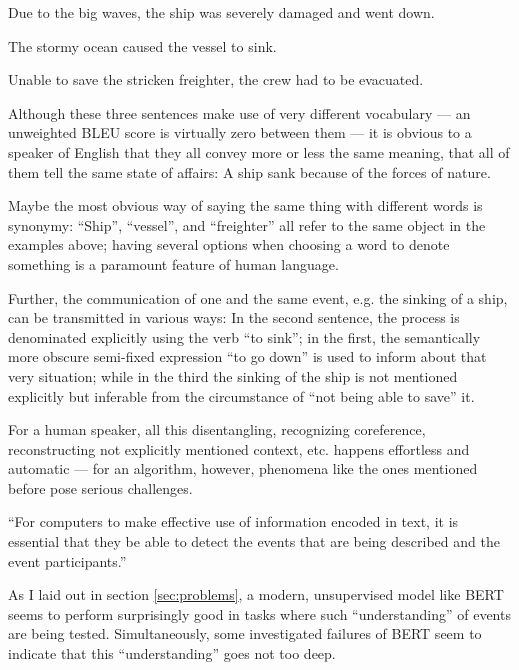 \begin{examples}
  \label{ex:semantics}
  \item Due to the big waves, the ship was severely damaged and went down.
  \item The stormy ocean caused the vessel to sink.
  \item Unable to save the stricken freighter, the crew had to be evacuated.
\end{examples}

Although these three sentences make use of very different vocabulary --- an unweighted BLEU score
is virtually zero between them --- it is obvious to a speaker of English that they all convey more
or less the same meaning, that all of them tell the same state of affairs: A ship sank because of the
forces of nature.

Maybe the most obvious way of saying the same thing with different words is synonymy: ``Ship'',
``vessel'', and ``freighter'' all refer to the same object in the examples above; having several
options when choosing a word to denote something is a paramount feature of human language.

Further, the communication of one and the same event, e.g. the sinking
of a ship, can be transmitted in various ways: In the second sentence,
the process is denominated explicitly using the verb ``to sink''; in
the first, the semantically more obscure semi-fixed expression ``to go
down'' is used to inform about that very situation; while in the third
the sinking of the ship is not mentioned explicitly but inferable from
the circumstance of ``not being able to save'' it.

For a human speaker, all this disentangling, recognizing coreference,
reconstructing not explicitly mentioned context, etc. happens effortless
and automatic --- for an algorithm, however, phenomena like the ones
mentioned before pose serious challenges.

``For computers to make effective use of information encoded in text, it is essential that
they be able to detect the events that are being described and the event participants.''
\citep{palmer2010semantic}

As I laid out in section \ref{sec:problems}, a modern, unsupervised model
like BERT seems to perform surprisingly good in tasks where such ``understanding'' of
events are being tested.
Simultaneously, some investigated failures of BERT seem to indicate that this ``understanding''
goes not too deep.

